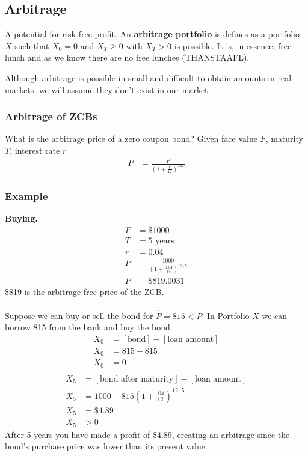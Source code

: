 \documentclass[12pt,letterpaper, twocolumn]{article}
\begin{document}
\subsection{Arbitrage}
A potential for risk free profit. 
An \textbf{arbitrage portfolio} is defines as a portfolio $X$ such that $X_0 = 0$ and $X_T \geq 0$ with $X_T > 0$ is possible. It is, in essence, free lunch and as we know there are no free lunches (THANSTAAFL). 

Although arbitrage is possible in small and difficult to obtain amounts in real markets, we will assume they don't exist in our market. 

\subsubsection{Arbitrage of ZCBs}
What is the arbitrage price of a zero coupon bond? Given face value $F$, maturity $T$, interest rate $r$
\begin{align*}P&=\frac{F}{(1+\frac{r}{12})^{12T}}\end{align*}

\subsubsection*{Example}
\textbf{Buying.} 
\begin{align*}
    F &= \$1000\\
    T&= 5\text{ years}\\
    r&= 0.04\\
    P&= \frac{1000}{(1+\frac{0.04}{12})^{12\cdot 5}}\\
    P&= \$819.0031
\end{align*}
\$819 is the arbitrage-free price of the ZCB.
\\\\
Suppose we can buy or sell the bond for $\hat{P}=815<P$. In Portfolio $X$ we can borrow 815 from the bank and buy the bond. 
\begin{align*}
    X_0 &= [\text{bond}] - [\text{loan amount}]\\
    X_0 &= 815-815\\
    X_0 &= 0\\
\end{align*}
\begin{align*}
    X_5 &= [\text{bond after maturity}] - [\text{loan amount}]\\
    X_5 &= 1000-815(1+\frac{.04}{12})^{12\cdot5}\\
    X_5 &= \$4.89\\
    X_5 &> 0
\end{align*}
After 5 years you have made a profit of \$4.89, creating an arbitrage since the bond's purchase price was lower than its present value. 
\end{document}
